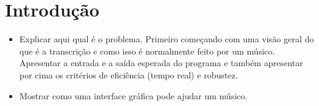 \chapter{Introdução}
\label{cap:introducao}

\begin{itemize}
\item Explicar aqui qual é o problema. Primeiro começando com uma visão geral do que é a transcrição e como isso é normalmente feito por um músico. Apresentar a entrada e a saída esperada do programa e também apresentar por cima os critérios de eficiência (tempo real) e robustez.
\item Mostrar como uma interface gráfica pode ajudar um músico.
\end{itemize}




